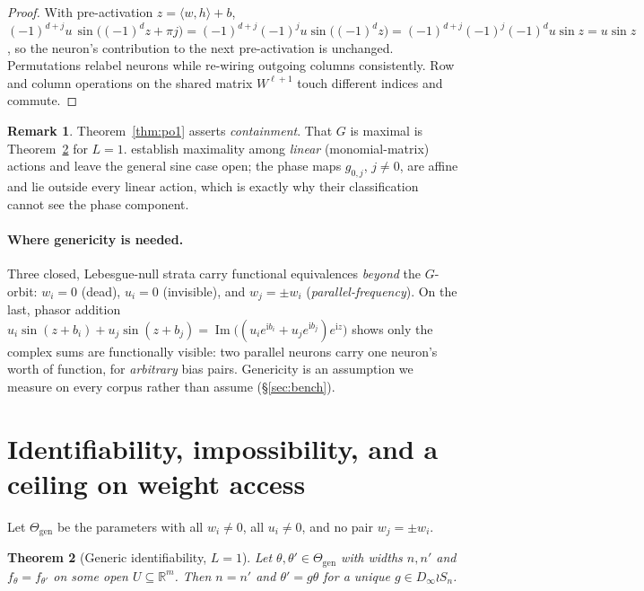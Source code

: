 \documentclass[10pt,twocolumn,letterpaper]{article}
\newtheorem{theorem}{Theorem}
\theoremstyle{definition}
\newtheorem{remark}[theorem]{Remark}
\newcommand{\R}{\mathbb{R}}
\newcommand{\Dinf}{D_\infty}
\newcommand{\Thgen}{\Theta_{\mathrm{gen}}}
\begin{document}
\begin{proof}
With pre-activation $z = \langle w,h\rangle + b$,
$(-1)^{d+j} u\,\sin\!\big((-1)^d z + \pi j\big)
 = (-1)^{d+j}(-1)^{j} u \sin\!\big((-1)^d z\big)
 = (-1)^{d+j}(-1)^{j}(-1)^{d} u \sin z = u \sin z$,
so the neuron's contribution to the next pre-activation is unchanged. Permutations relabel
neurons while re-wiring outgoing columns consistently. Row and column operations on the shared
matrix $W^{\ell+1}$ touch different indices and commute.
\end{proof}

\begin{remark}
Theorem~\ref{thm:po1} asserts \emph{containment}. That $G$ is maximal is
Theorem~\ref{thm:po2} for $L=1$. \citet{tran2024monomial} establish maximality among
\emph{linear} (monomial-matrix) actions and leave the general sine case open; the phase maps
$g_{0,j}$, $j\neq0$, are affine and lie outside every linear action, which is exactly why their
classification cannot see the phase component.
\end{remark}

\paragraph{Where genericity is needed.} Three closed, Lebesgue-null strata carry functional
equivalences \emph{beyond} the $G$-orbit: $w_i = 0$ (dead), $u_i = 0$ (invisible), and
$w_j = \pm w_i$ (\emph{parallel-frequency}). On the last, phasor addition
$u_i\sin(z+b_i) + u_j\sin(z+b_j) = \operatorname{Im}\big((u_ie^{\mathrm i b_i}
+ u_je^{\mathrm i b_j})e^{\mathrm i z}\big)$
shows only the complex sums are functionally visible: two parallel neurons carry one neuron's
worth of function, for \emph{arbitrary} bias pairs. Genericity is an assumption we measure on
every corpus rather than assume (\S\ref{sec:bench}).

\section{Identifiability, impossibility, and a ceiling on weight access}
\label{sec:identifiability}

Let $\Thgen$ be the parameters with all $w_i \neq 0$, all $u_i \neq 0$, and no pair
$w_j = \pm w_i$.

\begin{theorem}[Generic identifiability, $L=1$]\label{thm:po2}
Let $\theta,\theta' \in \Thgen$ with widths $n, n'$ and $f_\theta = f_{\theta'}$ on some open
$U \subseteq \R^m$. Then $n = n'$ and $\theta' = g\theta$ for a \emph{unique}
$g \in \Dinf \wr S_n$.
\end{theorem}
\end{document}
